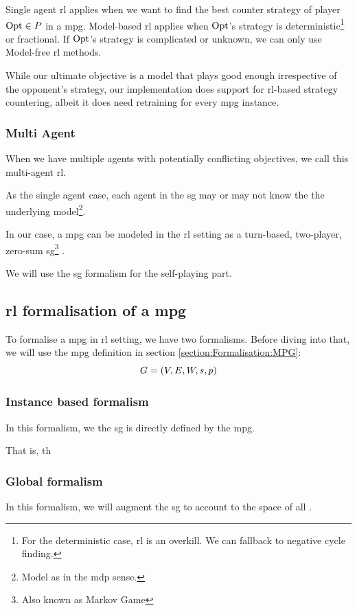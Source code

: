 Single agent \acrshort{rl} applies when we want to find the best counter strategy of player $\operatorname{Opt}\in P$ in a \acrshort{mpg}. Model-based \acrshort{rl} applies when $\operatorname{Opt}$'s strategy is deterministic\footnote{For the deterministic case, \acrshort{rl} is an overkill. We can fallback to negative cycle finding.} or fractional. If $\operatorname{Opt}$'s strategy is complicated or unknown, we can only use Model-free \acrshort{rl} methods.

While our ultimate objective is a model that plays good enough irrespective of the opponent's strategy, our implementation does support for \acrshort{rl}-based strategy countering, albeit it does need retraining for every \acrshort{mpg} instance.

\subsubsection{Multi Agent}
When we have multiple agents with potentially conflicting objectives, we call this multi-agent \acrshort{rl}.

As the single agent case, each agent in the \acrshort{sg} may or may not know the the underlying model\footnote{Model as in the \acrshort{mdp} sense.}.

In our case, a \acrshort{mpg} can be modeled in the \acrshort{rl} setting as a turn-based, two-player, zero-sum \acrfull{sg}\footnote{Also known as Markov Game} \cite{StochasticGames}.

We will use the \acrshort{sg} formalism for the self-playing part.
\subsection{\acrshort{rl} formalisation of a \acrshort{mpg}}
To formalise a \acrshort{mpg} in \acrshort{rl} setting, we have two formalisms. Before diving into that, we will use the \acrshort{mpg} definition in section \ref{section:Formalisation:MPG}:
\begin{equation*}
	G=(V,E,W,s,p)
\end{equation*}

\subsubsection{Instance based formalism}
In this formalism, we the \acrshort{sg} is directly defined by the \acrshort{mpg}.

That is, th

\subsubsection{Global formalism}
In this formalism, we will augment the \acrshort{sg} to account to the space of all .

